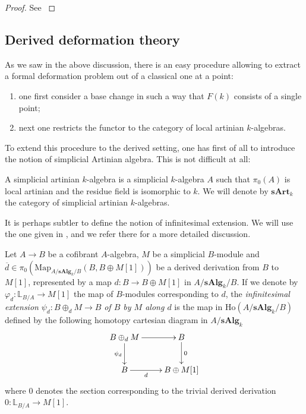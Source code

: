 \begin{refsection}
\begin{proof}
See \cite[Theorem 2.3.2]{sernesi}
\end{proof}

\subsection{Derived deformation theory}

As we saw in the above discussion, there is an easy procedure allowing to extract a formal deformation problem out of a classical one at a point:
\begin{enumerate}
\item one first consider a base change in such a way that $F(k)$ consists of a single point;
\item next one restricts the functor to the category of local artinian $k$-algebras.
\end{enumerate}

\noindent To extend this procedure to the derived setting, one has first of all to introduce the notion of simplicial Artinian algebra. This is not difficult at all:

\begin{defin}
A simplicial artinian $k$-algebra is a simplicial $k$-algebra $A$ such that $\pi_0(A)$ is local artinian and the residue field is isomorphic to $k$. We will denote by $\mathbf{sArt}_k$ the category of simplicial artinian $k$-algebras.
\end{defin}

It is perhaps subtler to define the notion of infinitesimal extension. We will use the one given in \cite{infinitesimalextension}, and we refer there for a more detailed discussion.

\begin{defin}\label{inf}
Let $A\to B$ be a cofibrant $A$-algebra, $M$ be a simplicial $B$-module and $\overline{d} \in \pi_0 (\mathrm{Map}_{A/\mathbf{sAlg}_k/B} (B, B\oplus M[1]))$ be a derived derivation from $B$ to $M[1]$, represented by a map $d \colon B \to B\oplus M[1]$ in $A / \mathbf{sAlg}_k /B$. If we denote by $\varphi_{d}: \mathbb{L}_{B/A}\to M[1]$ the map of $B$-modules corresponding to $d$, the \emph{infinitesimal extension} $\psi_{d}: B\oplus_{d}M \to B$ \emph{of $B$ by $M$ along $d$} is the map in $\mathrm{Ho}(A/\mathbf{sAlg}_k/B)$ defined by the following homotopy cartesian diagram in $A/\mathbf{sAlg}_k$
\[
\xymatrix{B\oplus_{d}M \ar[d]_-{\psi_{d}} \ar[r] & B \ar[d]^-{0} \\B \ar[r]_-{d} & B\oplus M[1] }
\]
where $0$ denotes the section corresponding to the trivial derived derivation $0 \colon \mathbb L_{B/A} \to M[1]$.
\end{defin}


\end{refsection}
